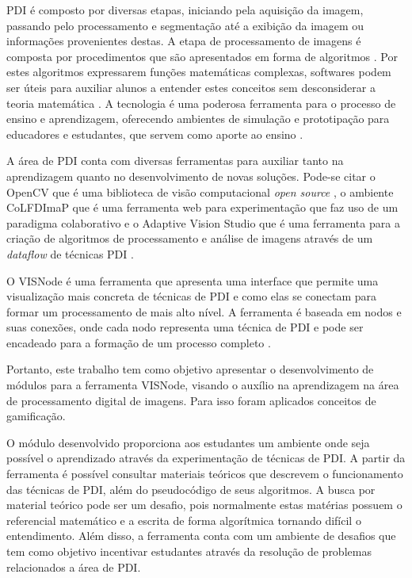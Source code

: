 \documentclass[
	12pt,				%
	oneside,			%
	a4paper,			%
	english,			%
	french,				%
	spanish,			%
	brazil,				%
	]{abntex2}
\begin{document}
PDI é composto por diversas etapas, iniciando pela aquisição da imagem, passando pelo processamento e segmentação até a exibição da imagem ou informações provenientes destas. A etapa de processamento de imagens é composta por procedimentos que são apresentados em forma de algoritmos \cite{gonzalesWoods:2008}. Por estes algoritmos expressarem funções matemáticas complexas, softwares podem ser úteis para auxiliar alunos a entender estes conceitos sem desconsiderar a teoria matemática \cite{lopez2016teaching}. A tecnologia é uma poderosa ferramenta para o processo de ensino e aprendizagem, oferecendo ambientes de simulação e prototipação para educadores e estudantes, que servem como aporte ao ensino \cite{henderson2017works}.

A área de PDI conta com diversas ferramentas para auxiliar tanto na aprendizagem quanto no desenvolvimento de novas soluções. Pode-se citar o OpenCV que é uma biblioteca de visão computacional \textit{open source} \cite{pulli2012realtime}, o ambiente CoLFDImaP que é uma ferramenta web para experimentação que faz uso de um paradigma colaborativo \cite{garcia2015colfdimap} e o Adaptive Vision Studio que é uma ferramenta para a criação de algoritmos de processamento e análise de imagens através de um \textit{dataflow} de técnicas PDI \cite{radlak2015adaptive}.

O VISNode é uma ferramenta que apresenta uma interface que permite uma visualização mais concreta de técnicas de PDI e como elas se conectam para formar um processamento de mais alto nível. A ferramenta é baseada em nodos e suas conexões, onde cada nodo representa uma técnica de PDI e pode ser encadeado para a  formação de um processo completo  \cite{visnode}.

Portanto, este trabalho tem como objetivo apresentar o desenvolvimento de módulos para a ferramenta VISNode, visando o auxílio na aprendizagem na área de processamento digital de imagens. Para isso foram aplicados conceitos de gamificação. 

O módulo desenvolvido proporciona aos estudantes um ambiente onde seja possível o aprendizado através da experimentação de técnicas de PDI. A partir da ferramenta é possível consultar materiais teóricos que descrevem o funcionamento das técnicas de PDI, além do pseudocódigo de seus algoritmos. A busca por material teórico pode ser um desafio, pois normalmente estas matérias possuem o referencial matemático e a escrita de forma algorítmica tornando difícil o entendimento. Além disso, a ferramenta conta com um ambiente de desafios que tem como objetivo incentivar estudantes através da resolução de problemas relacionados a área de PDI.
\end{document}
